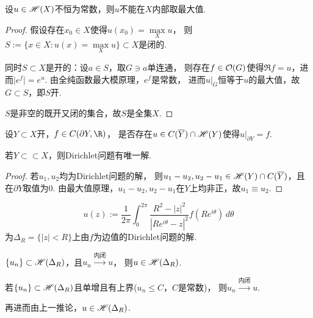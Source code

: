 \begin{proposition}[最大值原理]
	设$u\in \mathscr{H}(X)$不恒为常数，则$u$不能在$X$内部取最大值.
\end{proposition}

\begin{proof}
	假设存在$x_0\in X$使得$u(x_0)=\max\limits_X u$，
    则$S:=\{x\in X: u(x)=\max\limits_X u\}\subset X$是闭的.

	同时$S\subset X$是开的：设$a\in S$，取$G\ni a$单连通，
    则存在$f\in \mathcal{O}(G)$使得$\Re f=u$，进而$\vert e^f\vert =e^u$. 
    由全纯函数最大模原理，$e^f$是常数，
    进而$u|_G$恒等于$u$的最大值，故$G\subset S$，即$S$开.

	$S$是非空的既开又闭的集合，故$S$是全集$X$.
\end{proof}

\begin{proposition}[Dirichlet问题]
	设$Y\subset X$开，$f\in C(\partial Y,\R)$，
    是否存在$u\in C(\overline{Y})\cap \mathscr{H}(Y)$使得$u|_{\partial Y}=f$.
\end{proposition}

\begin{proposition}
	若$Y\subset \subset X$，则Dirichlet问题有唯一解.
\end{proposition}

\begin{proof}
	若$u_1,u_2$均为Dirichlet问题的解，
    则$u_1-u_2, u_2-u_1\in \mathscr{H}(Y) \cap C(\overline{Y})$，且在$\partial Y$取值为$0$. 
    由最大值原理，$u_1-u_2, u_2-u_1$在$Y$上均非正，故$u_1\equiv u_2$.
\end{proof}

\begin{theorem}[Poisson]
	$$u(z):=\frac{1}{2\pi} \int_0^{2\pi} 
    \frac{R^2-|z|^2}{|Re^{i\theta}-z|^2}f(Re^{i\theta})\,d\theta$$
	为$\Delta_R=\{|z|<R\}$上由$f$为边值的Dirichlet问题的解.
\end{theorem}

\begin{corollary}
	$\{u_n\}\subset \mathscr{H}(\Delta_R)$，且$u_n \xrightarrow{\text{内闭}} u$，
    则$u\in \mathscr{H}(\Delta_R)$.
\end{corollary}

\begin{corollary}[Harnack定理]
	若$\{u_n\}\subset \mathscr{H}(\Delta_R)$且单增且有上界($u_n \leq C$，$C$是常数)，
    则$u_n \xrightarrow{\text{内闭}}u$.

	再进而由上一推论，$u\in \mathscr{H}(\Delta_R)$.
\end{corollary}

